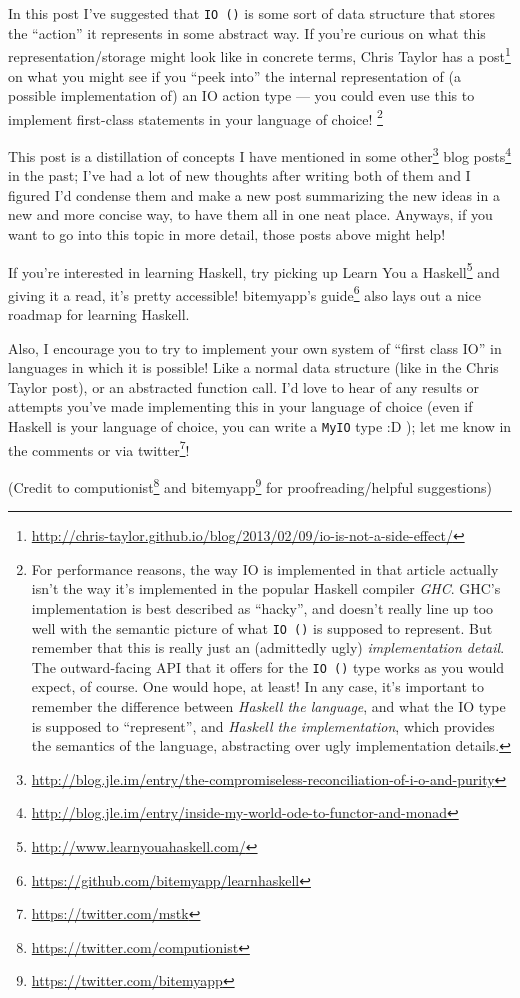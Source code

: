 \documentclass[]{article}
\renewcommand{\href}[2]{#2\footnote{\url{#1}}}
\begin{document}
In this post I've suggested that \texttt{IO\ ()} is some sort of data
structure that stores the ``action'' it represents in some abstract way.
If you're curious on what this representation/storage might look like in
concrete terms,
\href{http://chris-taylor.github.io/blog/2013/02/09/io-is-not-a-side-effect/}{Chris
Taylor has a post} on what you might see if you ``peek into'' the
internal representation of (a possible implementation of) an IO action
type --- you could even use this to implement first-class statements in
your language of choice! \footnote{For performance reasons, the way IO
  is implemented in that article actually isn't the way it's implemented
  in the popular Haskell compiler \emph{GHC}. GHC's implementation is
  best described as ``hacky'', and doesn't really line up too well with
  the semantic picture of what \texttt{IO\ ()} is supposed to represent.
  But remember that this is really just an (admittedly ugly)
  \emph{implementation detail}. The outward-facing API that it offers
  for the \texttt{IO\ ()} type works as you would expect, of course. One
  would hope, at least! In any case, it's important to remember the
  difference between \emph{Haskell the language}, and what the IO type
  is supposed to ``represent'', and \emph{Haskell the implementation},
  which provides the semantics of the language, abstracting over ugly
  implementation details.}

This post is a distillation of concepts I have mentioned in
\href{http://blog.jle.im/entry/the-compromiseless-reconciliation-of-i-o-and-purity}{some
other}
\href{http://blog.jle.im/entry/inside-my-world-ode-to-functor-and-monad}{blog
posts} in the past; I've had a lot of new thoughts after writing both of
them and I figured I'd condense them and make a new post summarizing the
new ideas in a new and more concise way, to have them all in one neat
place. Anyways, if you want to go into this topic in more detail, those
posts above might help!

If you're interested in learning Haskell, try picking up
\href{http://www.learnyouahaskell.com/}{Learn You a Haskell} and giving
it a read, it's pretty accessible!
\href{https://github.com/bitemyapp/learnhaskell}{bitemyapp's guide} also
lays out a nice roadmap for learning Haskell.

Also, I encourage you to try to implement your own system of ``first
class IO'' in languages in which it is possible! Like a normal data
structure (like in the Chris Taylor post), or an abstracted function
call. I'd love to hear of any results or attempts you've made
implementing this in your language of choice (even if Haskell is your
language of choice, you can write a \texttt{MyIO} type :D ); let me know
in the comments or via \href{https://twitter.com/mstk}{twitter}!

(Credit to \href{https://twitter.com/computionist}{computionist} and
\href{https://twitter.com/bitemyapp}{bitemyapp} for proofreading/helpful
suggestions)
\end{document}
